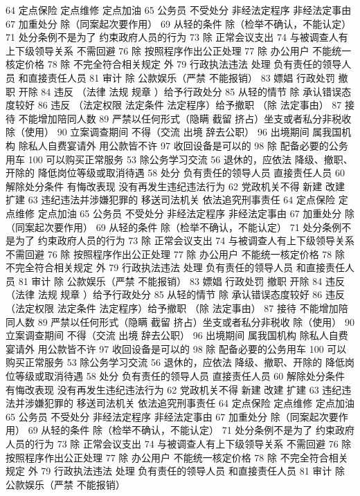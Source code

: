 \documentclass[cyan]{elegantnote}
\begin{document}
64 定点保险 定点维修 定点加油
65 公务员 不受处分
非经法定程序
非经法定事由
67 加重处分
除（同案起次要作用）
69 从轻的条件
除（检举不确认，不能认定）
71 处分条例不是为了
约束政府人员的行为
73 除 正常会议支出
74 与被调查人有上下级领导关系 不需回避
76 除 按照程序作出公正处理
77 除 办公用户
不能统一核定价格
78 除 不完全符合相关规定 外
79 行政执法违法 处理
负有责任的领导人员
和直接责任人员
81 审计
除 公款娱乐（严禁 不能报销）
83 嫖娼 行政处罚
撤职 开除
84 违反 （法律 法规 规章 ）给予行政处分
85 从轻的情节
除 承认错误态度较好
86 违反 （法定权限 法定条件 法定程序）给予撤职
（除 法定事由）
87 接待 不能增加陪同人数
89 严禁以任何形式（隐瞒 截留 挤占）坐支或者私分非税收
除（使用）
90 立案调查期间 不得（交流 出境 辞去公职）
96 出境期间 属我国机构 除私人自费宴请外 用公款皆不许
97 收回设备是可以的
98 除 配备必要的公务用车
100 可以购买正常服务
53 除公务学习交流
56 退休的，应依法
降级、撤职、开除的 降低岗位等级或取消待遇
58 处分
负有责任的领导人员
直接责任人员
60 解除处分条件
有悔改表现
没有再发生违纪违法行为
62 党政机关不得
新建 改建 扩建
63 违纪违法并涉嫌犯罪的
移送司法机关
依法追究刑事责任
64 定点保险 定点维修 定点加油
65 公务员 不受处分
非经法定程序
非经法定事由
67 加重处分
除（同案起次要作用）
69 从轻的条件
除（检举不确认，不能认定）
71 处分条例不是为了
约束政府人员的行为
73 除 正常会议支出
74 与被调查人有上下级领导关系 不需回避
76 除 按照程序作出公正处理
77 除 办公用户
不能统一核定价格
78 除 不完全符合相关规定 外
79 行政执法违法 处理
负有责任的领导人员
和直接责任人员
81 审计
除 公款娱乐（严禁 不能报销）
83 嫖娼 行政处罚
撤职 开除
84 违反 （法律 法规 规章 ）给予行政处分
85 从轻的情节
除 承认错误态度较好
86 违反 （法定权限 法定条件 法定程序）给予撤职
（除 法定事由）
87 接待 不能增加陪同人数
89 严禁以任何形式（隐瞒 截留 挤占）坐支或者私分非税收
除（使用）
90 立案调查期间 不得（交流 出境 辞去公职）
96 出境期间 属我国机构 除私人自费宴请外 用公款皆不许
97 收回设备是可以的
98 除 配备必要的公务用车
100 可以购买正常服务
53 除公务学习交流
56 退休的，应依法
降级、撤职、开除的 降低岗位等级或取消待遇
58 处分
负有责任的领导人员
直接责任人员
60 解除处分条件
有悔改表现
没有再发生违纪违法行为
62 党政机关不得
新建 改建 扩建
63 违纪违法并涉嫌犯罪的
移送司法机关
依法追究刑事责任
64 定点保险 定点维修 定点加油
65 公务员 不受处分
非经法定程序
非经法定事由
67 加重处分
除（同案起次要作用）
69 从轻的条件
除（检举不确认，不能认定）
71 处分条例不是为了
约束政府人员的行为
73 除 正常会议支出
74 与被调查人有上下级领导关系 不需回避
76 除 按照程序作出公正处理
77 除 办公用户
不能统一核定价格
78 除 不完全符合相关规定 外
79 行政执法违法 处理
负有责任的领导人员
和直接责任人员
81 审计
除 公款娱乐（严禁 不能报销）
\end{document}
